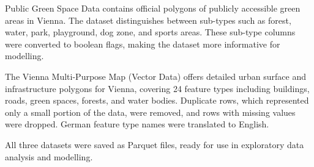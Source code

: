 Public Green Space Data \cite{greenspace} contains official polygons of publicly accessible green areas in Vienna. The dataset distinguishes between sub-types such as forest, water, park, playground, dog zone, and sports areas. These sub-type columns were converted to boolean flags, making the dataset more informative for modelling.

The Vienna Multi-Purpose Map (Vector Data) \cite{multipurposemap} offers detailed urban surface and infrastructure polygons for Vienna, covering 24 feature types including buildings, roads, green spaces, forests, and water bodies. Duplicate rows, which represented only a small portion of the data, were removed, and rows with missing values were dropped. German feature type names were translated to English.

All three datasets were saved as Parquet files, ready for use in exploratory data analysis and modelling.
